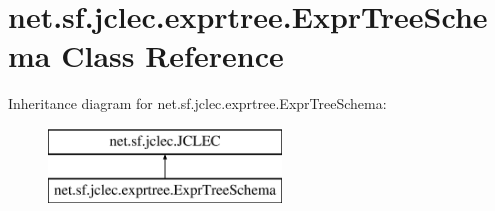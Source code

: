 \hypertarget{classnet_1_1sf_1_1jclec_1_1exprtree_1_1_expr_tree_schema}{\section{net.\-sf.\-jclec.\-exprtree.\-Expr\-Tree\-Schema Class Reference}
\label{classnet_1_1sf_1_1jclec_1_1exprtree_1_1_expr_tree_schema}
}
Inheritance diagram for net.\-sf.\-jclec.\-exprtree.\-Expr\-Tree\-Schema\-:\begin{figure}[H]
\begin{center}
\leavevmode
\includegraphics[height=2.000000cm]{classnet_1_1sf_1_1jclec_1_1exprtree_1_1_expr_tree_schema}
\end{center}
\end{figure}
